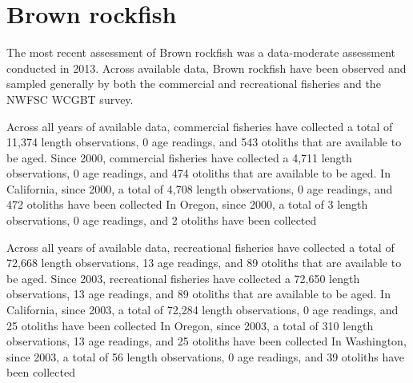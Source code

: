 \documentclass[11pt,
  english,
  letterpaper,
]{article}
\begin{document}

\hypertarget{brown-rockfish}{%
\section{Brown rockfish}\label{brown-rockfish}}

\leavevmode\tagmcend\tagstructend


The most recent assessment of Brown rockfish was a data-moderate assessment conducted in 2013. Across available data, Brown rockfish have been observed and sampled generally by both the commercial and recreational fisheries and the NWFSC WCGBT survey.

\leavevmode\tagmcend\tagstructend\par


Across all years of available data, commercial fisheries have collected a total of 11,374 length observations, 0 age readings, and 543 otoliths that are available to be aged. Since 2000, commercial fisheries have collected a 4,711 length observations, 0 age readings, and 474 otoliths that are available to be aged. In California, since 2000, a total of 4,708 length observations, 0 age readings, and 472 otoliths have been collected In Oregon, since 2000, a total of 3 length observations, 0 age readings, and 2 otoliths have been collected

\leavevmode\tagmcend\tagstructend\par


Across all years of available data, recreational fisheries have collected a total of 72,668 length observations, 13 age readings, and 89 otoliths that are available to be aged. Since 2003, recreational fisheries have collected a 72,650 length observations, 13 age readings, and 89 otoliths that are available to be aged. In California, since 2003, a total of 72,284 length observations, 0 age readings, and 25 otoliths have been collected In Oregon, since 2003, a total of 310 length observations, 13 age readings, and 25 otoliths have been collected In Washington, since 2003, a total of 56 length observations, 0 age readings, and 39 otoliths have been collected

\leavevmode\tagmcend\tagstructend\par
\end{document}
